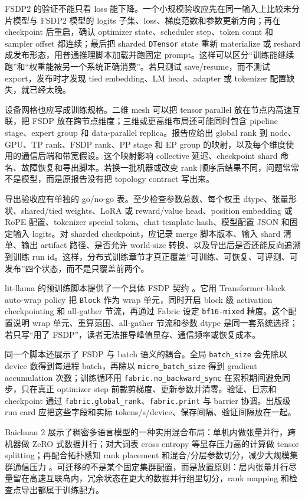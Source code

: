 \documentclass[UTF8,zihao=-4,openany]{ctexbook}
\begin{document}
FSDP2 的验证不能只看 loss 能下降。一个小规模验收应先在同一输入上比较未分片模型与 FSDP2 模型的 logits 子集、loss、梯度范数和参数更新方向；再在 checkpoint 后重启，确认 optimizer state、scheduler step、token count 和 sampler offset 都连续；最后把 sharded \texttt{DTensor} state 重新 materialize 或 reshard 成发布形态，用普通推理脚本加载并跑固定 prompt。这样可以区分“训练能继续跑”和“权重能被另一个系统正确消费”。若只测试 save/resume，而不测试 export，发布时才发现 tied embedding、LM head、adapter 或 tokenizer 配置缺失，就已经太晚。

设备网格也应写成训练规格。二维 mesh 可以把 tensor parallel 放在节点内高速互联，把 FSDP 放在跨节点维度；三维或更高维布局还可能同时包含 pipeline stage、expert group 和 data-parallel replica。报告应给出 global rank 到 node、GPU、TP rank、FSDP rank、PP stage 和 EP group 的映射，以及每个维度使用的通信后端和带宽假设。这个映射影响 collective 延迟、checkpoint shard 命名、故障恢复和导出脚本。若换一批机器或改变 rank 顺序后结果不同，问题常常不是模型，而是原报告没有把 topology contract 写出来。

导出验收应有单独的 go/no-go 表。至少检查参数总数、每个权重 dtype、张量形状、shared/tied weights、LoRA 或 reward/value head、position embedding 或 RoPE 配置、tokenizer special token、chat template hash、模型配置 JSON 和固定输入 logits。对 sharded checkpoint，应记录 merge 脚本版本、输入 shard 清单、输出 artifact 路径、是否允许 world-size 转换、以及导出后是否还能反向追溯到训练 run id。这样，分布式训练章节才真正覆盖“可训练、可恢复、可评测、可发布”四个状态，而不是只覆盖前两个。

lit-llama 的预训练脚本提供了一个具体 FSDP 契约 \cite{lightning2023litllama}。它用 Transformer-block auto-wrap policy 把 \texttt{Block} 作为 wrap 单元，同时开启 block 级 activation checkpointing 和 all-gather 节流，再通过 Fabric 设定 \texttt{bf16-mixed} 精度。这个配置说明 wrap 单元、重算范围、all-gather 节流和参数 dtype 是同一套系统选择；若只写“用了 FSDP”，读者无法推导峰值显存、通信频率或恢复成本。

同一个脚本还展示了 FSDP 与 batch 语义的耦合。全局 \texttt{batch\_size} 会先除以 device 数得到每进程 batch，再除以 \texttt{micro\_batch\_size} 得到 gradient accumulation 次数；训练循环用 \texttt{fabric.no\_backward\_sync} 在累积期间避免同步，只在真正 optimizer step 前裁剪梯度、更新参数并清零。验证、日志和 checkpoint 通过 \texttt{fabric.global\_rank}、\texttt{fabric.print} 与 barrier 协调。出版级 run card 应把这些字段和实际 tokens/s/device、保存间隔、验证间隔放在一起。

Baichuan 2 展示了稠密多语言模型的一种实用混合布局：单机内做张量并行，跨机器做 ZeRO 式数据并行；对大词表 cross entropy 等显存压力高的计算做 tensor splitting；再配合拓扑感知 rank placement 和混合/分层参数切分，减少大规模集群通信压力 \cite{yang2023baichuan2}。可迁移的不是某个固定集群配置，而是放置原则：层内张量并行尽量留在高速互联岛内，冗余状态在更大的数据并行组里切分，rank mapping 和检查点导出都属于训练配方。
\end{document}
